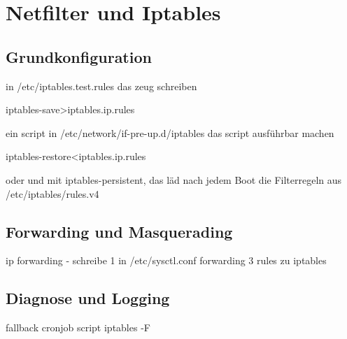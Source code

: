 \chapter{Netfilter und Iptables}
\section{Grundkonfiguration}
in /etc/iptables.test.rules das zeug schreiben

iptables-save>iptables.ip.rules

ein script in /etc/network/if-pre-up.d/iptables
das script ausführbar machen

iptables-restore<iptables.ip.rules

 oder und mit iptables-persistent, das läd nach jedem Boot die Filterregeln aus /etc/iptables/rules.v4

\section{Forwarding und Masquerading}
ip  forwarding - schreibe 1 in /etc/sysctl.conf forwarding
3 rules zu iptables

\section{Diagnose und Logging}
fallback cronjob script iptables -F
